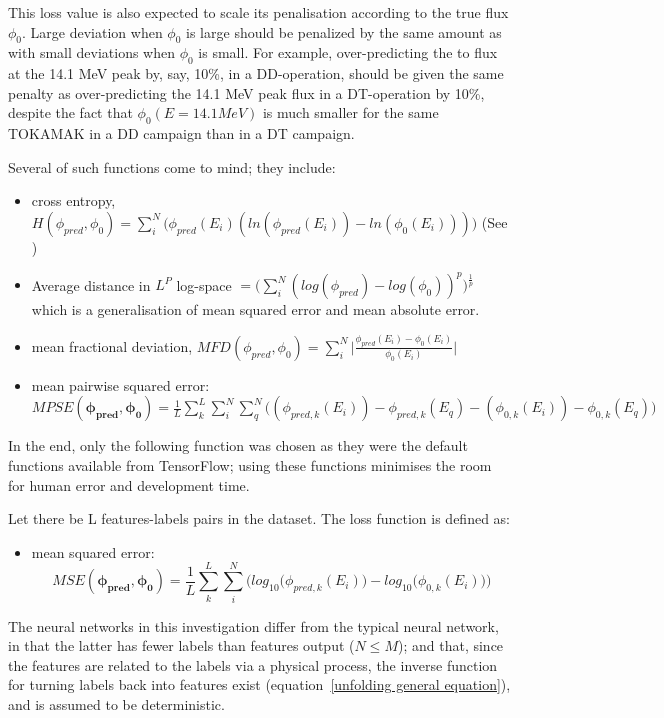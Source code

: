 \documentclass[a4paper, 12pt]{article}
\newcommand{\ve}[1]{\boldsymbol{#1}}
\begin{document}
    This loss value is also expected to scale its penalisation according to the true flux $\phi_{0}$. Large deviation when $\phi_0$ is large should be penalized by the same amount as with small deviations when $\phi_{0}$ is small. For example, over-predicting the to flux at the 14.1 MeV peak by, say, 10\%, in a DD-operation, should be given the same penalty as over-predicting the 14.1 MeV peak flux in a DT-operation by 10\%, despite the fact that $\phi_{0}(E=14.1 MeV)$ is much smaller for the same TOKAMAK in a DD campaign than in a DT campaign.

    Several of such functions come to mind; they include:

    \begin{itemize}
        \item cross entropy, $H(\phi_{pred}, \phi_{0}) = \sum_i^N \bigg(\phi_{pred}(E_i)(ln(\phi_{pred}(E_i)) - ln(\phi_{0}(E_i)))\bigg)$ (See \cite{Johnson-Shore-Deriv})
        \item Average distance in $L^P$ log-space $=\bigg(\sum_i^N(log(\phi_{pred})-log(\phi_{0}))^p\bigg)^{\frac{1}{p}}$
        which is a generalisation of mean squared error and mean absolute error.
        \item mean fractional deviation, $MFD (\phi_{pred}, \phi_{0}) = \sum_i^N \bigg|\frac{\phi_{pred}(E_i)-\phi_0(E_i)}{\phi_{0}(E_i)}\bigg|$
        \item mean pairwise squared error:\\
            $MPSE(\ve{\phi_{pred}}, \ve{\phi_{0}}) = \frac{1}{L} \sum_{k}^L \sum_i^N \sum_q^N \bigg( \left(\phi_{pred,k}(E_i)\right)-\phi_{pred,k}(E_q)-\left(\phi_{0,k}(E_i)\right)-\phi_{0,k}(E_q) \bigg)$
    \end{itemize}

    In the end, only the following function was chosen as they were the default functions available from TensorFlow; using these functions minimises the room for human error and development time.

    Let there be L features-labels pairs in the dataset. The loss function is defined as:
    \begin{itemize}
        \item mean squared error:
        \begin{equation}\label{MSE}
            MSE(\ve{\phi_{pred}},\ve{\phi_0}) = \frac{1}{L} \sum_{k}^L \sum_i^N \bigg( log_{10}\big(\phi_{pred,k}(E_i)\big)-log_{10}\big(\phi_{0,k}(E_i)\big) \bigg)
        \end{equation}
    \end{itemize}
    The neural networks in this investigation differ from the typical neural network, in that the latter has fewer labels than features output ($N \le M$); and that, since the features are related to the labels via a physical process, the inverse function for turning labels back into features exist (equation~\ref{unfolding general equation}), and is assumed to be deterministic.
    
\end{document}
